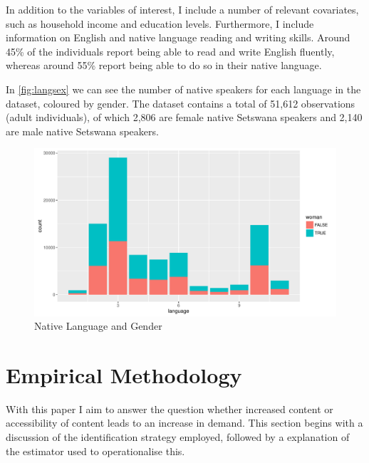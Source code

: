 \documentclass[a4paper,british]{article}\usepackage[]{graphicx}\usepackage[]{color}
\makeatletter
\def\maxwidth{ %
  \ifdim\Gin@nat@width>\linewidth
    \linewidth
  \else
    \Gin@nat@width
  \fi
}
\newenvironment{knitrout}{}{} %
\let\ref\autoref
\makeatother
\begin{document}
In addition to the variables of interest, I include a number of relevant
covariates, such as household income and education levels. Furthermore,
I include information on English and native language reading and writing
skills. Around 45\% of the individuals report being able to read and
write English fluently, whereas around 55\% report being able to do
so in their native language.

In \ref{fig:langsex} we can see the number of native speakers for
each language in the dataset, coloured by gender. The dataset contains
a total of 51,612 observations (adult individuals), of which 2,806
are female native Setswana speakers and 2,140 are male native Setswana
speakers.

\begin{figure}[H]
\caption{Native Language and Gender}

\label{fig:langsex}

\begin{knitrout}
\color{fgcolor}
\includegraphics[width=\maxwidth]{../misc/latex-lang_woman-1} 

\end{knitrout}
\end{figure}


\section{Empirical Methodology}

\label{sec:methods}With this paper I aim to answer the question whether
increased content or accessibility of content leads to an increase
in demand. This section begins with a discussion of the identification
strategy employed, followed by a explanation of the estimator used
to operationalise this.
\end{document}
